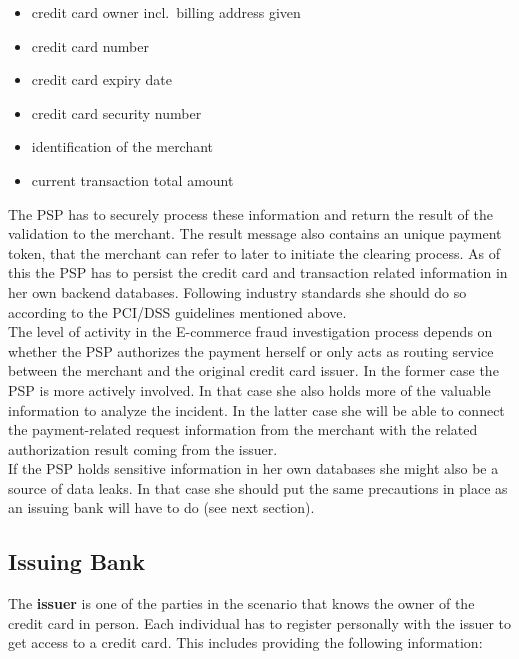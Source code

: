 \begin{itemize}
		\item credit card owner incl.\ billing address given
		\item credit card number
		\item credit card expiry date
		\item credit card security number
		\item identification of the merchant
		\item current transaction total amount
\end{itemize}

The \gls{PSP} has to securely process these information and return the result of the validation to the merchant. The result message also contains an unique payment token, that the merchant can refer to later to initiate the clearing process. As of this the \gls{PSP} has to persist the credit card and transaction related information in her own backend databases. Following industry standards she should do so according to the PCI/DSS guidelines mentioned above.\\

The level of activity in the E-commerce fraud investigation process depends on whether the \gls{PSP} authorizes the payment herself or only acts as routing service between the merchant and the original credit card issuer. In the former case the \gls{PSP} is more actively involved. In that case she also holds more of the valuable information to analyze the incident. In the latter case she will be able to connect the payment-related request information from the merchant with the related authorization result coming from the issuer.\\

If the \gls{PSP} holds sensitive information in her own databases she might also be a source of data leaks. In that case she should put the same precautions in place as an issuing bank will have to do (see next section).


\subsection{Issuing Bank}
\label{subsec:stakeholder_issuer}

The \textbf{issuer} is one of the parties in the scenario that knows the owner of the credit card in person. Each individual has to register personally with the issuer to get access to a credit card. This includes providing the following information:\@

